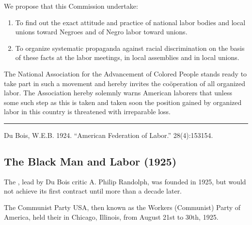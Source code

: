 \documentclass[letterpaper,10pt,english]{jupyterBook}
\begin{document}
\sphinxAtStartPar
We propose that this Commission undertake:
\begin{enumerate}
%
\item {} 
\sphinxAtStartPar
To find out the exact attitude and practice of national labor bodies and local unions toward Negroes and of Negro labor toward unions.

\item {} 
\sphinxAtStartPar
To organize systematic propaganda against racial discrimination on the basis of these facts at the labor meetings, in local assemblies and in local unions.

\end{enumerate}

\sphinxAtStartPar
The National Association for the Advancement of Colored People stands ready to take part in such a movement and hereby invites the coöperation of all organized labor. The Association hereby solemnly warns American laborers that unless some such step as this is taken and taken soon the position gained by organized labor in this country is threatened with irreparable loss.


\bigskip\hrule\bigskip


\sphinxAtStartPar
{} Du Bois, W.E.B. 1924. “American Federation of Labor.” 28(4):153\sphinxhyphen{}154.


\subsection{The Black Man and Labor (1925)}
\label{\detokenize{Volumes/31/02/black_man_and_labor:the-black-man-and-labor-1925}}\label{\detokenize{Volumes/31/02/black_man_and_labor::doc}}
\begin{sphinxShadowBox}
\sphinxstylesidebartitle{}

\sphinxAtStartPar
The , lead by Du Bois critic A. Philip Randolph, was founded in 1925, but would not achieve its first contract until more than a decade later.

\sphinxAtStartPar
The Communist Party USA, then known as the Workers (Communist) Party of America, held their  in Chicago, Illinois, from August 21st to 30th, 1925.
\end{sphinxShadowBox}
\end{document}
